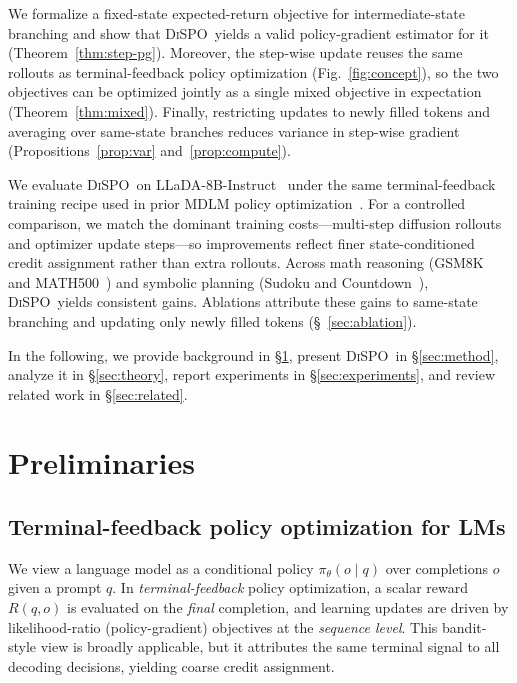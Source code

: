 \documentclass{article}
\newcommand{\method}{{\textsc{DiSPO}}}
\theoremstyle{plain}
\theoremstyle{definition}
\theoremstyle{remark}
\begin{document}
We formalize a fixed-state expected-return objective for intermediate-state branching and show that \method\ yields a valid policy-gradient estimator for it (Theorem~\ref{thm:step-pg}).
Moreover, the step-wise update reuses the same rollouts as terminal-feedback policy optimization (Fig.~\ref{fig:concept}), so the two objectives can be optimized jointly as a single mixed objective in expectation (Theorem~\ref{thm:mixed}).
Finally, restricting updates to newly filled tokens and averaging over same-state branches reduces variance in step-wise gradient (Propositions~\ref{prop:var} and~\ref{prop:compute}).


We evaluate \method\ on LLaDA-8B-Instruct~\citep{nie2025largelanguagediffusionmodels} under the same terminal-feedback training recipe used in prior MDLM policy optimization~\citep{zhao2025d1}.
For a controlled comparison, we match the dominant training costs---multi-step diffusion rollouts and optimizer update steps---so improvements reflect finer state-conditioned credit assignment rather than extra rollouts.
Across math reasoning (GSM8K~\citep{gsm8k} and MATH500~\citep{lightman2023lets}) and symbolic planning (Sudoku and Countdown~\citep{zhao2025d1}), \method\ yields consistent gains.
Ablations attribute these gains to same-state branching and updating only newly filled tokens (\S~\ref{sec:ablation}).


In the following, we provide background in \S\ref{sec:background}, present \method\ in \S\ref{sec:method}, analyze it in \S\ref{sec:theory}, report experiments in \S\ref{sec:experiments}, and review related work in \S\ref{sec:related}.


\section{Preliminaries}\label{sec:background}
\subsection{Terminal-feedback policy optimization for LMs}
\label{sec:bg:grpo}
We view a language model as a conditional policy $\pi_\theta(o\mid q)$ over completions $o$ given a prompt $q$.
In \emph{terminal-feedback} policy optimization, a scalar reward $R(q,o)$ is evaluated on the \emph{final} completion, and learning updates are driven by likelihood-ratio (policy-gradient) objectives at the \emph{sequence level}.
This bandit-style view is broadly applicable, but it attributes the same terminal signal to all decoding decisions, yielding coarse credit assignment.
\end{document}
